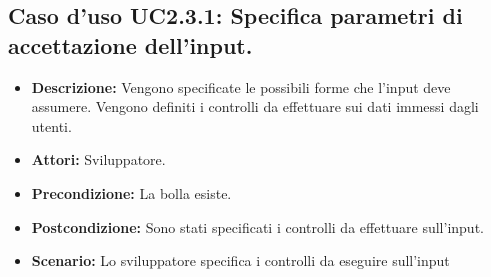 \subsection{Caso d'uso UC2.3.1: Specifica parametri di accettazione dell'input.}
\begin{itemize}
\item[]\textbf{Descrizione:} Vengono specificate le possibili forme che l'input deve assumere. Vengono definiti i controlli da effettuare sui dati immessi dagli utenti.
\item[]\textbf{Attori:} Sviluppatore. 
\item[]\textbf{Precondizione:} La bolla esiste. 
\item[]\textbf{Postcondizione:} Sono stati specificati i controlli da effettuare sull'input. 
\item[]\textbf{Scenario:}
Lo sviluppatore specifica i controlli da eseguire sull'input 
\end{itemize}

\clearpage

